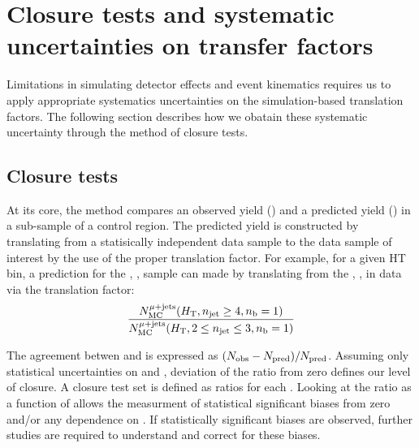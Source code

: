 \clearpage
\section{Closure tests and systematic uncertainties on transfer factors\label{sec:bkgd-syst}}

Limitations in simulating detector effects and event kinematics 
requires us to apply appropriate systematics uncertainties 
on the simulation-based translation factors.  The following section 
describes how we obatain these systematic uncertainty through the 
method of closure tests.

\subsection{Closure tests\label{sec:closure-tests-desc}}

At its core, the method compares an observed yield (\nobs) and a predicted
yield (\npre) in a sub-sample of a control region.  The predicted yield is constructed
by translating from a statisically independent data sample to the data sample of
interest by the use of the proper translation factor.  For example, for a given HT bin,
a prediction for the \njethigh, , \mj sample can made by translating from the
\njetlow, , \mj in data via the translation factor: 
\begin{equation}
  \label{equ:tf-ratio-closure}
  \frac{N_{\rm MC}^{\rm \mu + jets}(\mbox{$H_\text{T}$},n_{\text{jet}} \geq 4, n_{\text{b}}=1)}{N_{\rm MC}^{\rm \mu + jets}(\mbox{$H_\text{T}$},2 \leq n_{\text{jet}} \leq 3,n_{\text{b}}=1)} 
\end{equation}

The agreement betwen \nobs and \npre is expressed as $(N_{\textrm{obs}} - N_{\textrm{pred}})/N_{\textrm{pred}}$.
Assuming only statistical uncertainties on \nobs and \npre, deviation of the 
ratio from zero defines our level of closure. A closure test set is defined
as ratios for each \scaleht. Looking at the ratio as a function
of \scaleht allows the measurment of statistical significant biases from zero and/or 
any dependence on \scaleht.  If statistically significant biases
are observed, further studies are required to understand and correct
for these biases.

